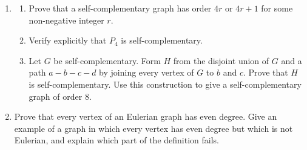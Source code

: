 \documentclass[svgnames]{amsart}
\begin{document}
\begin{enumerate}[resume]
\item
\begin{enumerate}
  \item Prove that a self-complementary graph has order $4r$ or $4r + 1$   for some non-negative integer $r$.
  \item Verify explicitly that $P_4$ is self-complementary.
  \item Let $G$ be self-complementary. Form $H$ from the disjoint union   of $G$ and a path $a-b-c-d$ by joining every vertex of $G$ to $b$ and   $c$. Prove that $H$ is self-complementary. Use this construction to   give a self-complementary graph of order $8$.
\end{enumerate}

\item Prove that every vertex of an Eulerian graph has even degree. Give an example of a graph in which every vertex has even degree but which is not Eulerian, and explain which part of the definition fails.
\end{enumerate}
\end{document}
